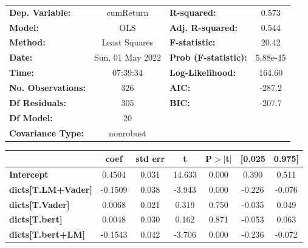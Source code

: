 \begin{center}
\begin{tabular}{lclc}
\toprule
\textbf{Dep. Variable:}              &    cumReturn     & \textbf{  R-squared:         } &     0.573   \\
\textbf{Model:}                      &       OLS        & \textbf{  Adj. R-squared:    } &     0.544   \\
\textbf{Method:}                     &  Least Squares   & \textbf{  F-statistic:       } &     20.42   \\
\textbf{Date:}                       & Sun, 01 May 2022 & \textbf{  Prob (F-statistic):} &  5.88e-45   \\
\textbf{Time:}                       &     07:39:34     & \textbf{  Log-Likelihood:    } &    164.60   \\
\textbf{No. Observations:}           &         326      & \textbf{  AIC:               } &    -287.2   \\
\textbf{Df Residuals:}               &         305      & \textbf{  BIC:               } &    -207.7   \\
\textbf{Df Model:}                   &          20      & \textbf{                     } &             \\
\textbf{Covariance Type:}            &    nonrobust     & \textbf{                     } &             \\
\bottomrule
\end{tabular}
\begin{tabular}{lcccccc}
                                     & \textbf{coef} & \textbf{std err} & \textbf{t} & \textbf{P$> |$t$|$} & \textbf{[0.025} & \textbf{0.975]}  \\
\midrule
\textbf{Intercept}                   &       0.4504  &        0.031     &    14.633  &         0.000        &        0.390    &        0.511     \\
\textbf{dicts[T.LM+Vader]}           &      -0.1509  &        0.038     &    -3.943  &         0.000        &       -0.226    &       -0.076     \\
\textbf{dicts[T.Vader]}              &       0.0068  &        0.021     &     0.319  &         0.750        &       -0.035    &        0.049     \\
\textbf{dicts[T.bert]}               &       0.0048  &        0.030     &     0.162  &         0.871        &       -0.053    &        0.063     \\
\textbf{dicts[T.bert+LM]}            &      -0.1543  &        0.042     &    -3.706  &         0.000        &       -0.236    &       -0.072     \\

\end{tabular}
\end{center}

